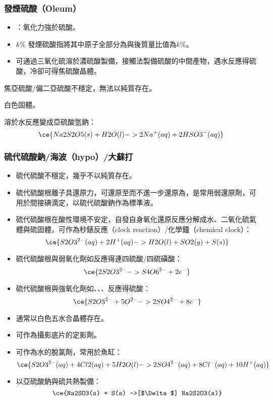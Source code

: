 \documentclass[a4paper,12pt]{report}
\begin{document}
\subsubsection{發煙硫酸（Oleum）}
\begin{itemize}
\item {}：氧化力強於硫酸。
\item $k$\% 發煙硫酸指將其中原子全部分為與後質量比值為$k$\%。
\item 可通過三氧化硫溶於濃硫酸製備，接觸法製備硫酸的中間產物，遇水反應得硫酸，冷卻可得焦硫酸晶體。
\end{itemize}
\bit
\item 焦亞硫酸/偏二亞硫酸不穩定，無法以純質存在。
\item 白色固體。
\item 溶於水反應變成亞硫酸氫鈉：
\[\ce{Na2S2O5(s) + H2O(l) -> 2Na^+(aq) + 2HSO3^-(aq)}\]
\eit
\subsubsection{硫代硫酸鈉/海波（hypo）/大蘇打}
\begin{itemize}
\item 硫代硫酸不穩定，幾乎不以純質存在。
\item 硫代硫酸根離子具還原力，可還原至而不進一步還原為，是常用弱還原劑，可用於間接碘滴定，以硫代硫酸鈉作為標準液。
\item 硫代硫酸根在酸性環境不安定，自發自身氧化還原反應分解成水、二氧化硫氣體與硫固體，可作為秒錶反應（clock reaction）/化學鐘（chemical clock）：
\[\ce{S2O3^{2-}(aq) + 2H^+(aq) -> H2O(l) + SO2(g) + S(s)}\]
\item 硫代硫酸根與弱氧化劑如反應得連四硫酸/四硫磺酸：
\[\ce{2S2O3^{2-} -> S4O6^{2-} + 2e^-}\]
\item 硫代硫酸根與強氧化劑如、、、反應得硫酸：
\[\ce{S2O3^{2-} + 5O^{2-} -> 2SO4^{2-} + 8e^-}\]
\item 通常以白色五水合晶體存在。
\item 可作為攝影底片的定影劑。
\item 可作為水的脫氯劑，常用於魚缸：
\[\ce{S2O3^{2-}(aq) + 4Cl2(aq) + 5H2O(l) -> 2SO4^{2-}(aq) + 8Cl^-(aq) + 10H^+(aq)}\]
\item 以亞硫酸鈉與硫共熱製備：
\[\ce{Na2SO3(s) + S(s) ->[$\Delta$] Na2S2O3(s)}\]
\end{itemize}
\end{document}
